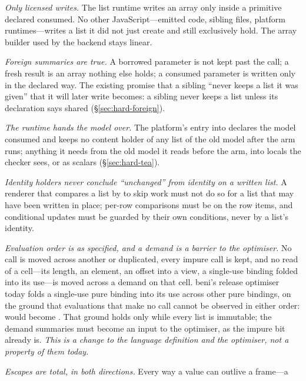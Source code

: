\begin{description}[leftmargin=2.2em,style=sameline,font=\normalfont\bfseries]
\item[A1] \emph{Only licensed writes.} The list runtime writes an array only inside a primitive
declared consumed. No other JavaScript---emitted code, sibling files, platform runtimes---writes a list
it did not just create and still exclusively hold. The array builder used by the backend stays linear.
\item[A2] \emph{Foreign summaries are true.} A borrowed parameter is not kept past the call; a fresh
result is an array nothing else holds; a consumed parameter is written only in the declared way. The
existing promise that a sibling ``never keeps a list it was given'' that it will later write becomes:
a sibling never keeps a list unless its declaration says shared (\S\ref{sec:hard-foreign}).
\item[A3] \emph{The runtime hands the model over.} The platform's entry into  declares
the model consumed and keeps no content holder of any list of the old model after the arm runs;
anything it needs from the old model it reads before the arm, into locals the checker sees, or as
scalars (\S\ref{sec:hard-tea}).
\item[A4] \emph{Identity holders never conclude ``unchanged'' from identity on a written list.} A
renderer that compares a list by \code{===} to skip work must not do so for a list that may have been
written in place; per-row comparisons must be on the row items, and conditional updates must be
guarded by their own conditions, never by a list's identity.
\item[A5] \emph{Evaluation order is as specified, and a demand is a barrier to the optimiser.} No call
is moved across another or duplicated, every impure call is kept, and no read of a cell---its length,
an element, an offset into a view, a single-use binding folded into its use---is moved across a demand
on that cell. beni's release optimiser today folds a single-use pure binding into its use across other
pure bindings, on the ground that evaluations that make no call cannot be observed in either order:
 would become
. That ground holds only while every list is immutable; the demand
summaries must become an input to the optimiser, as the impure bit already is. \emph{This is a change
to the language definition and the optimiser, not a property of them today.}
\item[A6] \emph{Escapes are total, in both directions.} Every way a value can outlive a frame---a

\end{description}

